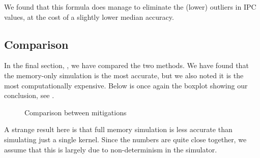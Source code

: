 We found that this formula does manage to eliminate the (lower) outliers in IPC values, at the cost of a slightly lower median accuracy.

\subsection{Comparison}\label{subsec:comparison}
In the final section, , we have compared the two methods.
We have found that the memory-only simulation is the most accurate, but we also noted it is the most computationally expensive.
Below is once again the boxplot showing our conclusion, see .

\begin{figure}[hb]
    \centering
    \caption{Comparison between mitigations}
    \label{fig:concl-mitig-comp}
\end{figure}

A strange result here is that full memory simulation is less accurate than simulating just a single kernel.
Since the numbers are quite close together, we assume that this is largely due to non-determinism in the simulator.